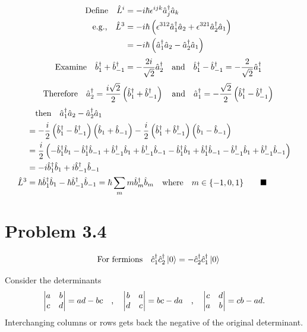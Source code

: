 \documentclass{amsart}
\begin{document}
\begin{align*}
    \qq{Define}\hat{L}^i&=-i\hbar \epsilon^{ijk}\hat{a}^\dagger_j\hat{a}_k\\
    \qq{e.g.,}\hat{L}^3&=-i\hbar\left(\epsilon^{312}\hat{a}^\dagger_1\hat{a}_2 +\epsilon^{321}\hat{a}^\dagger_2\hat{a}_1\right)\\
    &=-i\hbar\left(\hat{a}^\dagger_1\hat{a}_2 -\hat{a}^\dagger_2\hat{a}_1\right)
\end{align*}
\[\qq{Examine}\hat{b}^\dagger_1+\hat{b}^\dagger_{-1}=-\frac{2i}{\sqrt{2}}\hat{a}^\dagger_2 \qq{and}\hat{b}^\dagger_1-\hat{b}^\dagger_{-1}=-\frac{2}{\sqrt{2}}\hat{a}^\dagger_1    \]
\[\qq{Therefore}\hat{a}^\dagger_2=\frac{i\sqrt{2}}{2}\left(\hat{b}^\dagger_1+\hat{b}^\dagger_{-1}\right) \qq{and}\hat{a}^\dagger_1=-\frac{\sqrt{2}}{2}\left(\hat{b}^\dagger_1-\hat{b}^\dagger_{-1} \right)   \]
\begin{align*}
    &\qthen\hat{a}^\dagger_1\hat{a}_2 -\hat{a}^\dagger_2\hat{a}_1\\
    &=-\frac{i}{2}\left(\hat{b}^\dagger_1-\hat{b}^\dagger_{-1} \right)\left(\hat{b}_1+\hat{b}_{-1}\right)-\frac{i}{2}\left(\hat{b}^\dagger_1+\hat{b}^\dagger_{-1}\right)\left(\hat{b}_1-\hat{b}_{-1}\right)\\
    &=\frac{i}{2}\left(-\hat{b}^\dagger_1 \hat{b}_1-\hat{b}^\dagger_1 \hat{b}_{-1}+\hat{b}^\dagger_{-1} \hat{b}_1+\hat{b}^\dagger_{-1} \hat{b}_{-1}-\hat{b}^\dagger_1 \hat{b}_1+\hat{b}^\dagger_1 \hat{b}_{-1}-\hat{b}^\dagger_{-1} \hat{b}_1+\hat{b}^\dagger_{-1} \hat{b}_{-1}\right)\\
    &=-i\hat{b}^\dagger_1 \hat{b}_1+i\hat{b}^\dagger_{-1} \hat{b}_{-1}\\
    \hat{L}^3&=\hbar\hat{b}^\dagger_1 \hat{b}_1-\hbar\hat{b}^\dagger_{-1} \hat{b}_{-1}=\hbar\sum_m m\hat{b}^\dagger_m \hat{b}_m\qq{where}m\in\{-1,0,1\}\qquad\blacksquare
\end{align*}


\section*{Problem 3.4}
\[\qq{For fermions}\hat{c}^\dagger_1 \hat{c}^\dagger_2\ket{0}=-\hat{c}^\dagger_2 \hat{c}^\dagger_1\ket{0}  \]

Consider the determinants
\[
\begin{vmatrix} a & b \\ c & d \end{vmatrix}=ad-bc\qq{,} \begin{vmatrix} b & a \\ d & c \end{vmatrix}=bc-da\qq{,} \begin{vmatrix} c & d \\ a & b \end{vmatrix}=cb-ad.
\]
Interchanging columns or rows gets back the negative of the original determinant.
\end{document}
